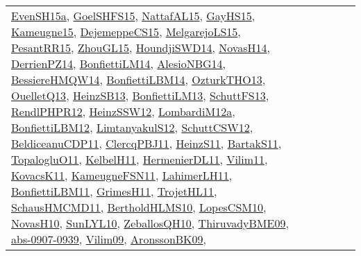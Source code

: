 {\begin{longtable}{lp{3cm}>{\raggedright}p{6cm}>{\raggedright}p{6cm}p{8cm}}
\href{articles/EvenSH15a.pdf}{EvenSH15a}\cite{EvenSH15a}, \href{articles/GoelSHFS15.pdf}{GoelSHFS15}\cite{GoelSHFS15}, \href{articles/NattafAL15.pdf}{NattafAL15}\cite{NattafAL15}, \href{papers/GayHS15.pdf}{GayHS15}\cite{GayHS15}, \href{articles/Kameugne15.pdf}{Kameugne15}\cite{Kameugne15}, \href{papers/DejemeppeCS15.pdf}{DejemeppeCS15}\cite{DejemeppeCS15}, \href{papers/MelgarejoLS15.pdf}{MelgarejoLS15}\cite{MelgarejoLS15}, \href{papers/PesantRR15.pdf}{PesantRR15}\cite{PesantRR15}, \href{papers/ZhouGL15.pdf}{ZhouGL15}\cite{ZhouGL15}, \href{papers/HoundjiSWD14.pdf}{HoundjiSWD14}\cite{HoundjiSWD14}, \href{articles/NovasH14.pdf}{NovasH14}\cite{NovasH14}, \href{papers/DerrienPZ14.pdf}{DerrienPZ14}\cite{DerrienPZ14}, \href{papers/BonfiettiLM14.pdf}{BonfiettiLM14}\cite{BonfiettiLM14}, \href{papers/AlesioNBG14.pdf}{AlesioNBG14}\cite{AlesioNBG14}, \href{papers/BessiereHMQW14.pdf}{BessiereHMQW14}\cite{BessiereHMQW14}, \href{articles/BonfiettiLBM14.pdf}{BonfiettiLBM14}\cite{BonfiettiLBM14}, \href{articles/OzturkTHO13.pdf}{OzturkTHO13}\cite{OzturkTHO13}, \href{papers/OuelletQ13.pdf}{OuelletQ13}\cite{OuelletQ13}, \href{articles/HeinzSB13.pdf}{HeinzSB13}\cite{HeinzSB13}, \href{papers/BonfiettiLM13.pdf}{BonfiettiLM13}\cite{BonfiettiLM13}, \href{papers/SchuttFS13.pdf}{SchuttFS13}\cite{SchuttFS13}, \href{papers/RendlPHPR12.pdf}{RendlPHPR12}\cite{RendlPHPR12}, \href{articles/HeinzSSW12.pdf}{HeinzSSW12}\cite{HeinzSSW12}, \href{articles/LombardiM12a.pdf}{LombardiM12a}\cite{LombardiM12a}, \href{papers/BonfiettiLBM12.pdf}{BonfiettiLBM12}\cite{BonfiettiLBM12}, \href{articles/LimtanyakulS12.pdf}{LimtanyakulS12}\cite{LimtanyakulS12}, \href{papers/SchuttCSW12.pdf}{SchuttCSW12}\cite{SchuttCSW12}, \href{articles/BeldiceanuCDP11.pdf}{BeldiceanuCDP11}\cite{BeldiceanuCDP11}, \href{papers/ClercqPBJ11.pdf}{ClercqPBJ11}\cite{ClercqPBJ11}, \href{papers/HeinzS11.pdf}{HeinzS11}\cite{HeinzS11}, \href{articles/BartakS11.pdf}{BartakS11}\cite{BartakS11}, \href{articles/TopalogluO11.pdf}{TopalogluO11}\cite{TopalogluO11}, \href{articles/KelbelH11.pdf}{KelbelH11}\cite{KelbelH11}, \href{papers/HermenierDL11.pdf}{HermenierDL11}\cite{HermenierDL11}, \href{papers/Vilim11.pdf}{Vilim11}\cite{Vilim11}, \href{articles/KovacsK11.pdf}{KovacsK11}\cite{KovacsK11}, \href{papers/KameugneFSN11.pdf}{KameugneFSN11}\cite{KameugneFSN11}, \href{papers/LahimerLH11.pdf}{LahimerLH11}\cite{LahimerLH11}, \href{papers/BonfiettiLBM11.pdf}{BonfiettiLBM11}\cite{BonfiettiLBM11}, \href{papers/GrimesH11.pdf}{GrimesH11}\cite{GrimesH11}, \href{articles/TrojetHL11.pdf}{TrojetHL11}\cite{TrojetHL11}, \href{articles/SchausHMCMD11.pdf}{SchausHMCMD11}\cite{SchausHMCMD11}, \href{papers/BertholdHLMS10.pdf}{BertholdHLMS10}\cite{BertholdHLMS10}, \href{articles/LopesCSM10.pdf}{LopesCSM10}\cite{LopesCSM10}, \href{articles/NovasH10.pdf}{NovasH10}\cite{NovasH10}, \href{papers/SunLYL10.pdf}{SunLYL10}\cite{SunLYL10}, \href{articles/ZeballosQH10.pdf}{ZeballosQH10}\cite{ZeballosQH10}, \href{papers/ThiruvadyBME09.pdf}{ThiruvadyBME09}\cite{ThiruvadyBME09}, \href{articles/abs-0907-0939.pdf}{abs-0907-0939}\cite{abs-0907-0939}, \href{papers/Vilim09.pdf}{Vilim09}\cite{Vilim09}, \href{papers/AronssonBK09.pdf}{AronssonBK09}\cite{AronssonBK09}, 
\end{longtable}}
